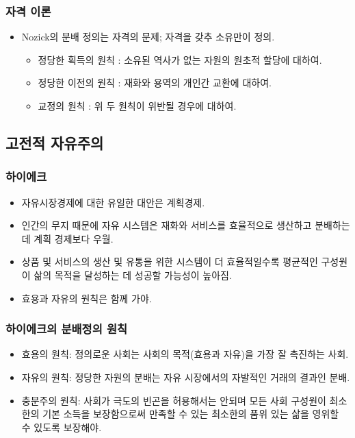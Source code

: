 \documentclass[aspectratio=169,xcolor=dvipsnames,handout]{beamer}
\begin{document}
\begin{frame}[<+->]
\frametitle{자격 이론}
    \begin{itemize}
        \item Nozick의 분배 정의는 자격의 문제; 자격을 갖추 소유만이 정의.
        \begin{itemize}
            \item 정당한 획득의 원칙 : 소유된 역사가 없는 자원의 원초적 할당에 대하여.
            \item 정당한 이전의 원칙 : 재화와 용역의 개인간 교환에 대하여.
            \item 교정의 원칙 : 위 두 원칙이 위반될 경우에 대하여.
        \end{itemize}
    \end{itemize}
\end{frame}

\subsection{고전적 자유주의}%
\begin{frame}[<+->]
\frametitle{하이에크}
    \begin{itemize}
        \item 자유시장경제에 대한 유일한 대안은 계획경제.
        \item 인간의 무지 때문에 자유 시스템은 재화와 서비스를 효율적으로 생산하고 분배하는 데 계획 경제보다 우월.
        \item 상품 및 서비스의 생산 및 유통을 위한 시스템이 더 효율적일수록 평균적인 구성원이 삶의 목적을 달성하는 데 성공할 가능성이 높아짐. 
        \item 효용과 자유의 원칙은 함께 가야.
    \end{itemize}
\end{frame}

\begin{frame}[<+->]
\frametitle{하이에크의 분배정의 원칙}
    \begin{itemize}
        \item 효용의 원칙: 정의로운 사회는 사회의 목적(효용과 자유)을 가장 잘 촉진하는 사회.
        \item 자유의 원칙: 정당한 자원의 분배는 자유 시장에서의 자발적인 거래의 결과인 분배.
        \item 충분주의 원칙: 사회가 극도의 빈곤을 허용해서는 안되며 모든 사회 구성원이 최소한의 기본 소득을 보장함으로써 만족할 수 있는 최소한의 품위 있는 삶을 영위할 수 있도록 보장해야.
    \end{itemize}
\end{frame}
\end{document}
